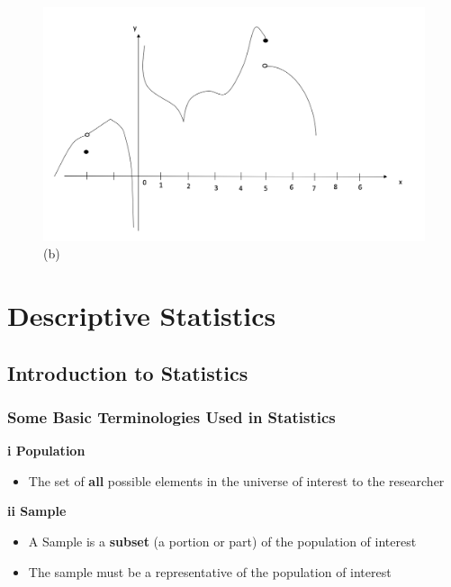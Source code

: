 \documentclass[]{book}
\providecommand{\tightlist}{%
  \setlength{\itemsep}{0pt}\setlength{\parskip}{0pt}}
\begin{document}
\begin{figure}

{\centering \includegraphics[width=0.7\linewidth]{figure/5Derivatives-10} 

}

\caption{(b)}\label{fig:p2}
\end{figure}

\hypertarget{descriptive-statistics}{%
\chapter{Descriptive Statistics}\label{descriptive-statistics}}


\hypertarget{introduction-to-statistics}{%
\section{Introduction to Statistics}\label{introduction-to-statistics}}

\hypertarget{some-basic-terminologies-used-in-statistics}{%
\subsection{Some Basic Terminologies Used in Statistics}\label{some-basic-terminologies-used-in-statistics}}

\textbf{i Population}

\begin{itemize}
\tightlist
\item
  The set of \textbf{all} possible elements in the universe of interest to the researcher
\end{itemize}

\textbf{ii Sample}

\begin{itemize}
\tightlist
\item
  A Sample is a \textbf{subset} (a portion or part) of the population of interest
\item
  The sample must be a representative of the population of interest
\end{itemize}
\end{document}

